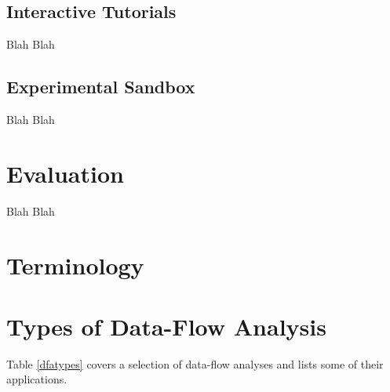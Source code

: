 \documentclass[bsc,twoside,singlespacing,parskip,logo,notimes,normalheadings]{infthesis}
\begin{document}
    \section{Interactive Tutorials}
    Blah Blah
    
    \section{Experimental Sandbox}
    Blah Blah
    

\chapter{Evaluation}
Blah Blah


\begin{appendices}

\chapter{Terminology}\label{glossary}

\printglossaries

\chapter{Types of Data-Flow Analysis}\label{analysistypes}

Table \ref{dfatypes} covers a selection of data-flow analyses and lists some of their applications.


\end{appendices}
\end{document}
